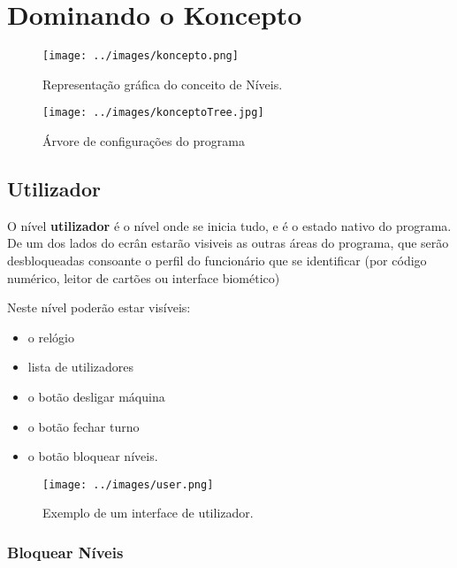 \documentclass[a4paper,11pt,openany]{memoir}
\begin{document}
\part{Dominando o Koncepto}

                 


\begin{figure}
\texttt{[image: ../images/koncepto.png]}
\caption[Submanifold]{Representação gráfica do conceito de Níveis.}
\end{figure}

\begin{figure}
\texttt{[image: ../images/konceptoTree.jpg]}
\caption[Submanifold]{Árvore de configurações do programa}
\end{figure}




\chapter{Utilizador} 

O nível \textbf{utilizador} é o nível onde se inicia tudo, e é o estado nativo do programa.
De um dos lados do ecrân estarão visiveis as outras áreas do programa, que serão desbloqueadas 
consoante o perfil do funcionário que se identificar (por código numérico, leitor de cartões ou interface biomético)

Neste nível poderão estar visíveis:
\begin{itemize}
\item o relógio
\item lista de utilizadores
\item o botão desligar máquina
\item o botão fechar turno
\item o botão bloquear níveis.
\end{itemize}
\begin{figure}
\texttt{[image: ../images/user.png]}
\caption[Submanifold]{Exemplo de um interface de utilizador.}
\end{figure}

\section{Bloquear Níveis}
\end{document}
